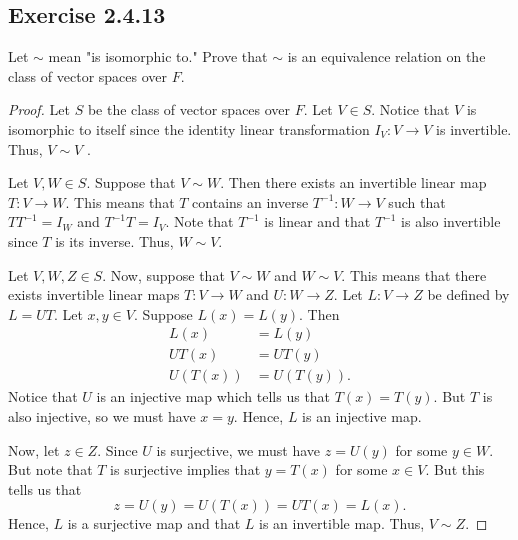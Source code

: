 \subsection*{Exercise 2.4.13} Let \( \sim \) mean "is isomorphic to." Prove that \(  \sim \) is an equivalence relation on the class of vector spaces over \( F  \). 
\begin{proof}
Let \( S  \) be the class of vector spaces over \( F \). Let \( V \in S  \). Notice that \( V  \) is isomorphic to itself since the identity linear transformation \( {I}_{V}: V \to V  \) is invertible. Thus, \( V \sim V  \) .

Let \( V, W \in S \). Suppose that \( V \sim W  \). Then there exists an invertible linear map \(  T: V \to W   \). This means that \( T  \) contains an inverse \( T^{-1}: W \to V  \) such that \( T T^{-1} = {I}_{W} \) and \( T^{-1}T = {I}_{V} \). Note that \( T^{-1}  \) is linear and that \( T^{-1}  \) is also invertible since \( T  \) is its inverse. Thus, \( W \sim V  \).

Let \( V, W, Z \in S   \). Now, suppose that \( V \sim W  \) and \( W \sim V  \). This means that there exists invertible linear maps \( T: V \to W  \) and \( U: W \to Z  \). Let \( L: V \to Z  \) be defined by \( L = UT  \). Let \( x,y \in V  \). Suppose \( L(x) = L(y)  \). Then
\begin{align*}
    L(x) &= L(y) \\
    UT(x) &= UT(y) \\
    U(T(x)) &= U(T(y)). 
\end{align*}
Notice that \( U  \) is an injective map which tells us that \( T(x) = T(y) \). But \( T  \) is also injective, so we must have \( x = y \). Hence, \( L  \) is an injective map.

    Now, let \( z \in Z  \). Since \( U  \) is surjective, we must have \( z = U(y) \) for some \( y \in W    \). But note that \( T \) is surjective implies that \( y = T(x)  \) for some \( x \in V  \). But this tells us that  
    \[  z = U(y) = U(T(x)) = UT(x) = L(x). \]
    Hence, \( L  \) is a surjective map and that \( L  \) is an invertible map. Thus, \( V \sim Z  \). 
\end{proof}

